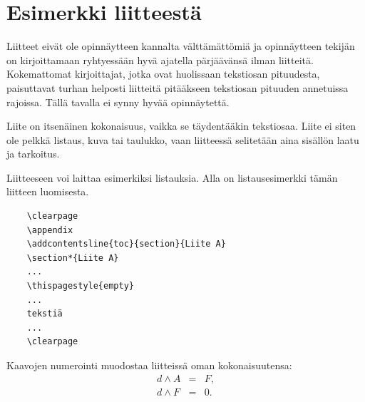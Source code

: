 \documentclass[finnish,12pt,a4paper,pdftex]{article}
\begin{document}
\appendix 
\clearpage

\section{Esimerkki liitteestä\label{LiiteA}}
\renewcommand{\theequation}{A\arabic{equation}}
\setcounter{equation}{0}  
\renewcommand{\thefigure}{A\arabic{figure}}
\setcounter{figure}{0}
\renewcommand{\thetable}{A\arabic{table}}
\setcounter{table}{0}

Liitteet eivät ole opinnäytteen kannalta välttämättömiä ja 
opinnäytteen tekijän on 
kirjoittamaan ryhtyessään hyvä ajatella pärjäävänsä ilman liitteitä.
Kokemattomat kirjoittajat, jotka ovat huolissaan
tekstiosan pituudesta, paisuttavat turhan 
helposti liitteitä pitääkseen tekstiosan pituuden annetuissa rajoissa.
Tällä tavalla ei synny hyvää opinnäytettä.   

Liite on itsenäinen kokonaisuus, vaikka se täydentääkin tekstiosaa.
Liite ei siten ole pelkkä listaus, kuva tai taulukko, vaan 
liitteessä selitetään aina sisällön laatu ja tarkoitus. 

Liitteeseen voi laittaa esimerkiksi listauksia. Alla on 
listausesimerkki tämän liitteen luomisesta. 

\begin{verbatim}
	\clearpage
	\appendix
	\addcontentsline{toc}{section}{Liite A}
	\section*{Liite A}
	...
	\thispagestyle{empty}
	...
	tekstiä
	...
	\clearpage
\end{verbatim}

Kaavojen numerointi muodostaa liitteissä oman kokonaisuutensa:
\begin{eqnarray}
d \wedge A  &=& F, \label{liitekaava1}\\
d \wedge F  &=& 0. \label{liitekaava2}
\end{eqnarray}
\end{document}
